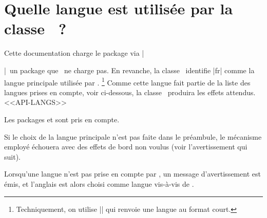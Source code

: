 \documentclass{main}
\begin{document}
\section{Quelle langue est utilisée par la classe \thisproj\ ?}

Cette documentation charge le package  via \tdoclatexin|\usepackage[french]{babel}|\, un package que \thisproj\ ne charge pas.
En revanche, la classe \thisproj\ identifie \tdoclatexin|fr| comme la langue principale utilisée par .%
\footnote{
    Techniquement, on utilise \tdoclatexin|| qui renvoie une langue au format court.
}
Comme cette langue fait partie de la liste des langues prises en compte, voir ci-dessous, la classe \thisproj\ produira les effets attendus.
<<API-LANGS>>


\begin{tdocnote}
    Les packages  et  sont pris en compte.
\end{tdocnote}


\begin{tdoccaut}
    Si le choix de la langue principale n'est pas faite dans le préambule, le mécanisme employé échouera avec des effets de bord non voulus (voir l'avertissement qui suit).
\end{tdoccaut}


\begin{tdocwarn}
    Lorsqu'une langue n'est pas prise en compte par \thisproj, un message d'avertissement est émis, et l'anglais est alors choisi comme langue vis-à-vis de \thisproj.
\end{tdocwarn}
\end{document}
